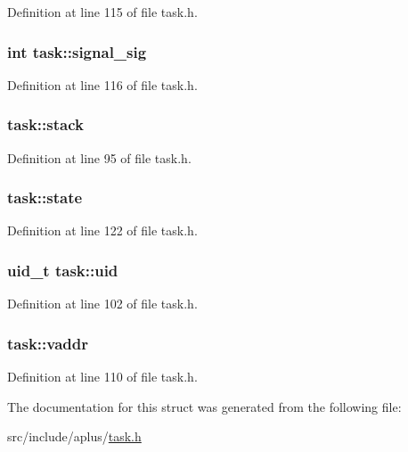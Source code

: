 Definition at line 115 of file task.\+h.

\hypertarget{structtask_a3d6991558f05258094bbef5c47073928}{
\subsubsection[{signal\+\_\+sig}]{\setlength{\rightskip}{0pt plus 5cm}int task\+::signal\+\_\+sig}}\label{structtask_a3d6991558f05258094bbef5c47073928}


Definition at line 116 of file task.\+h.

\hypertarget{structtask_a71232ebd31259f41c057b3e789b44587}{
\subsubsection[{stack}]{ task\+::stack}}\label{structtask_a71232ebd31259f41c057b3e789b44587}


Definition at line 95 of file task.\+h.

\hypertarget{structtask_a09ebd490ccb87f169fd7c3d8d95b4f39}{
\subsubsection[{state}]{ task\+::state}}\label{structtask_a09ebd490ccb87f169fd7c3d8d95b4f39}


Definition at line 122 of file task.\+h.

\hypertarget{structtask_ade8fc4c414bce856dacf9efee3031be8}{
\subsubsection[{uid}]{\setlength{\rightskip}{0pt plus 5cm}uid\+\_\+t task\+::uid}}\label{structtask_ade8fc4c414bce856dacf9efee3031be8}


Definition at line 102 of file task.\+h.

\hypertarget{structtask_a340cbedbdc4b542793e7677dd4966ade}{
\subsubsection[{vaddr}]{ task\+::vaddr}}\label{structtask_a340cbedbdc4b542793e7677dd4966ade}


Definition at line 110 of file task.\+h.



The documentation for this struct was generated from the following file\+:\begin{DoxyCompactItemize}
\item 
src/include/aplus/\hyperlink{task_8h}{task.\+h}\end{DoxyCompactItemize}
